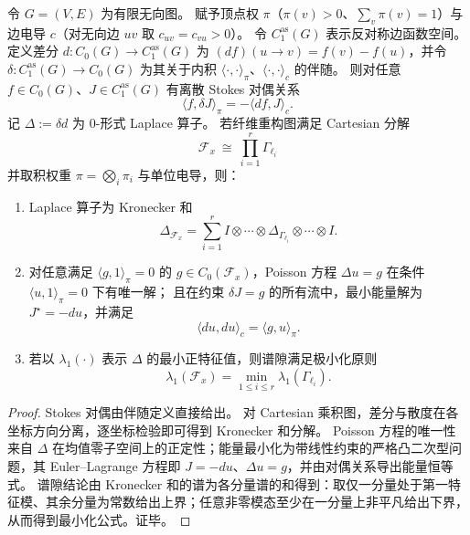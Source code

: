 \begin{theorem}\label{thm:pom-fiber-hodge-stein-tensorization-gap}
令 \(G=(V,E)\) 为有限无向图。
赋予顶点权 \(\pi\)（\(\pi(v)>0\)、\(\sum_v\pi(v)=1\)）与边电导 \(c\)（对无向边 \(uv\) 取 \(c_{uv}=c_{vu}>0\)）。
令 \(C_1^{\mathrm{as}}(G)\) 表示反对称边函数空间。
定义差分 \(d:C_0(G)\to C_1^{\mathrm{as}}(G)\) 为 \((df)(u\to v)=f(v)-f(u)\)，并令 \(\delta:C_1^{\mathrm{as}}(G)\to C_0(G)\) 为其关于内积 \(\langle\cdot,\cdot\rangle_\pi\)、\(\langle\cdot,\cdot\rangle_c\) 的伴随。
则对任意 \(f\in C_0(G)\)、\(J\in C_1^{\mathrm{as}}(G)\) 有离散 Stokes 对偶关系
\[
\langle f,\delta J\rangle_\pi=-\langle df,J\rangle_c.
\]
记 \(\Delta:=\delta d\) 为 \(0\)-形式 Laplace 算子。
若纤维重构图满足 Cartesian 分解
\[
\mathcal F_x\ \cong\ \prod_{i=1}^r \Gamma_{\ell_i}
\]
并取积权重 \(\pi=\bigotimes_i\pi_i\) 与单位电导，则：
\begin{enumerate}
  \item Laplace 算子为 Kronecker 和
  \[
  \Delta_{\mathcal F_x}
  =\sum_{i=1}^r I\otimes\cdots\otimes \Delta_{\Gamma_{\ell_i}}\otimes\cdots\otimes I.
  \]
  \item 对任意满足 \(\langle g,1\rangle_\pi=0\) 的 \(g\in C_0(\mathcal F_x)\)，Poisson 方程 \(\Delta u=g\) 在条件 \(\langle u,1\rangle_\pi=0\) 下有唯一解；
  且在约束 \(\delta J=g\) 的所有流中，最小能量解为 \(J^\star=-du\)，并满足
  \[
  \langle du,du\rangle_c=\langle g,u\rangle_\pi.
  \]
  \item 若以 \(\lambda_1(\cdot)\) 表示 \(\Delta\) 的最小正特征值，则谱隙满足极小化原则
  \[
  \lambda_1(\mathcal F_x)=\min_{1\le i\le r}\lambda_1(\Gamma_{\ell_i}).
  \]
\end{enumerate}
\end{theorem}

\begin{proof}
Stokes 对偶由伴随定义直接给出。
对 Cartesian 乘积图，差分与散度在各坐标方向分离，逐坐标检验即可得到 Kronecker 和分解。
Poisson 方程的唯一性来自 \(\Delta\) 在均值零子空间上的正定性；能量最小化为带线性约束的严格凸二次型问题，其 Euler--Lagrange 方程即 \(J=-du\)、\(\Delta u=g\)，并由对偶关系导出能量恒等式。
谱隙结论由 Kronecker 和的谱为各分量谱的和得到：取仅一分量处于第一特征模、其余分量为常数给出上界；任意非零模态至少在一分量上非平凡给出下界，从而得到最小化公式。证毕。
\end{proof}

\endinput
